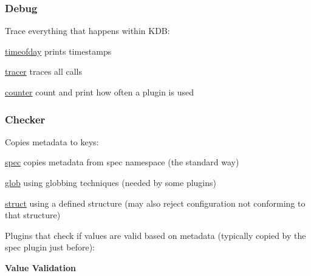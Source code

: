 \subsubsection*{Debug}

Trace everything that happens within K\+DB\+:


\begin{DoxyItemize}
\item \hyperlink{md_src_plugins_timeofday_README_src_plugins_timeofday_README_md}{timeofday} prints timestamps
\item \hyperlink{md_src_plugins_tracer_README_src_plugins_tracer_README_md}{tracer} traces all calls
\item \hyperlink{md_src_plugins_counter_README_src_plugins_counter_README_md}{counter} count and print how often a plugin is used
\end{DoxyItemize}

\subsubsection*{Checker}

Copies metadata to keys\+:


\begin{DoxyItemize}
\item \hyperlink{md_src_plugins_spec_README_src_plugins_spec_README_md}{spec} copies metadata from spec namespace (the standard way)
\item \hyperlink{md_src_plugins_glob_README_src_plugins_glob_README_md}{glob} using globbing techniques (needed by some plugins)
\item \hyperlink{md_src_plugins_struct_README_src_plugins_struct_README_md}{struct} using a defined structure (may also reject configuration not conforming to that structure)
\end{DoxyItemize}

Plugins that check if values are valid based on metadata (typically copied by the {\ttfamily spec} plugin just before)\+:

{\bfseries Value Validation}


